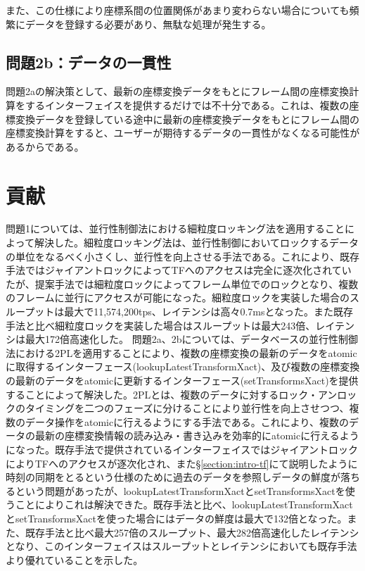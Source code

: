 \documentclass[a4paper]{jreport}	%
\begin{document}
また、この仕様により座標系間の位置関係があまり変わらない場合についても頻繁にデータを登録する必要があり、無駄な処理が発生する。

\subsection*{問題2b：データの一貫性}
問題2aの解決策として、最新の座標変換データをもとにフレーム間の座標変換計算をするインターフェイスを提供するだけでは不十分である。これは、複数の座標変換データを登録している途中に最新の座標変換データをもとにフレーム間の座標変換計算をすると、ユーザーが期待するデータの一貫性がなくなる可能性があるからである。


\section{貢献}
問題1については、並行性制御法における細粒度ロッキング法を適用することによって解決した。細粒度ロッキング法は、並行性制御においてロックするデータの単位をなるべく小さくし、並行性を向上させる手法である。これにより、既存手法ではジャイアントロックによってTFへのアクセスは完全に逐次化されていたが、提案手法では細粒度ロックによってフレーム単位でのロックとなり、複数のフレームに並行にアクセスが可能になった。細粒度ロックを実装した場合のスループットは最大で11,574,200tps、レイテンシは高々0.7msとなった。また既存手法と比べ細粒度ロックを実装した場合はスループットは最大243倍、レイテンシは最大172倍高速化した。
問題2a、2bについては、データベースの並行性制御法における2PLを適用することにより、複数の座標変換の最新のデータをatomicに取得するインターフェース(lookupLatestTransformXact)、及び複数の座標変換の最新のデータをatomicに更新するインターフェース(setTransformsXact)を提供することによって解決した。2PLとは、複数のデータに対するロック・アンロックのタイミングを二つのフェーズに分けることにより並行性を向上させつつ、複数のデータ操作をatomicに行えるようにする手法である。これにより、複数のデータの最新の座標変換情報の読み込み・書き込みを効率的にatomicに行えるようになった。既存手法で提供されているインターフェイスではジャイアントロックによりTFへのアクセスが逐次化され、また§\ref{section:intro-tf}にて説明したように時刻の同期をとるという仕様のために過去のデータを参照しデータの鮮度が落ちるという問題があったが、lookupLatestTransformXactとsetTransformsXactを使うことによりこれは解決できた。既存手法と比べ、lookupLatestTransformXactとsetTransformsXactを使った場合にはデータの鮮度は最大で132倍となった。また、既存手法と比べ最大257倍のスループット、最大282倍高速化したレイテンシとなり、このインターフェイスはスループットとレイテンシにおいても既存手法より優れていることを示した。
\end{document}
